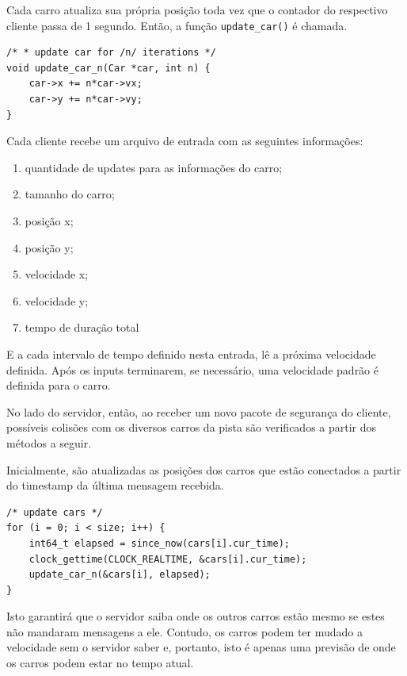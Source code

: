 \documentclass[10pt,twocolumn,letterpaper]{article}
\begin{document}
    Cada carro atualiza sua própria posição toda vez que o contador do respectivo cliente passa de 1 segundo. Então, a função \texttt{update\_car()} é chamada.

\begin{lstlisting}[caption={Código para a atualização de um carro}, label=Algorithm]
/* * update car for /n/ iterations */
void update_car_n(Car *car, int n) {
    car->x += n*car->vx;
    car->y += n*car->vy;
}
\end{lstlisting}

    Cada cliente recebe um arquivo de entrada com as seguintes informações:

    \begin{enumerate}
        \item quantidade de updates para as informações do carro;
        \item tamanho do carro;
        \item posição x;
        \item posição y;
        \item velocidade x;
        \item velocidade y;
        \item tempo de duração total
    \end{enumerate}

    E a cada intervalo de tempo definido nesta entrada, lê a próxima velocidade definida. Após os inputs terminarem, se necessário, uma velocidade padrão é definida para o carro.

    No lado do servidor, então, ao receber um novo pacote de segurança do cliente, possíveis colisões com os diversos carros da pista são verificados a partir dos métodos a seguir.

    Inicialmente, são atualizadas as posições dos carros que estão conectados a partir do timestamp da última mensagem recebida.

\begin{lstlisting}[caption={Código para atualização dos carros}, label=Algorithm]
/* update cars */
for (i = 0; i < size; i++) {
    int64_t elapsed = since_now(cars[i].cur_time);
    clock_gettime(CLOCK_REALTIME, &cars[i].cur_time);
    update_car_n(&cars[i], elapsed);
}
\end{lstlisting}

    Isto garantirá que o servidor saiba onde os outros carros estão mesmo se estes não mandaram mensagens a ele. Contudo, os carros podem ter mudado a velocidade sem o servidor saber e, portanto, isto é apenas uma previsão de onde os carros podem estar no tempo atual.
    
\end{document}
